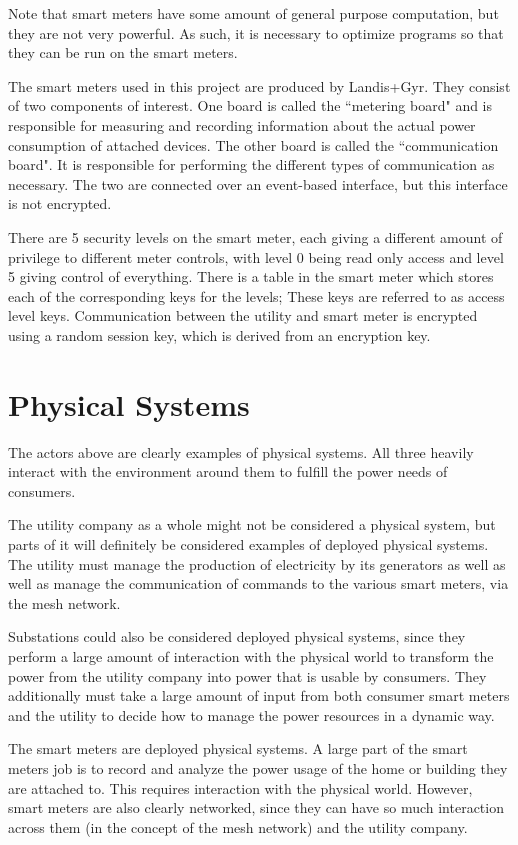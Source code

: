 Note that smart meters have some amount of general purpose computation, but they are not very powerful. As such,
it is necessary to optimize programs so that they can be run on the smart meters.

The smart meters used in this project are produced by Landis+Gyr. They consist of two components of interest. One
board is called the ``metering board" and is responsible for measuring and recording information about the actual
power consumption of attached devices. The other board is called the ``communication board". It is responsible for
performing the different types of communication as necessary. The two are connected over an event-based interface,
but this interface is not encrypted. 

There are 5 security levels on the smart meter, each giving a different amount of privilege to different meter controls,
with level 0 being read only access and level 5 giving control of everything. There is a table in the smart meter which
stores each of the corresponding keys for the levels; These keys are referred to as access level keys.
Communication between the utility and smart meter is encrypted
using a random session key, which is derived from an encryption key.

\section{Physical Systems}
The actors above are clearly examples of physical systems. All three heavily interact with the environment around them
to fulfill the power needs of consumers.

The utility company as a whole might not be considered a physical system, but parts of it will definitely be considered
examples of deployed physical systems. The utility must manage the production of electricity by its generators as well
as well as manage the communication of commands to the various smart meters, via the mesh network.

Substations could also be considered deployed physical systems, since they perform a large amount of interaction
with the physical world to transform the power from the utility company into power that is usable by consumers.
They additionally must take a large amount of input from both consumer smart meters and the utility to decide how
to manage the power resources in a dynamic way.

The smart meters are deployed physical systems. A large part of the smart meters job is to record and analyze
the power usage of the home or building they are attached to. This requires interaction with the physical world. However,
smart meters are also clearly networked, since they can have so much interaction across them (in the 
concept of the mesh network) and the utility company.

